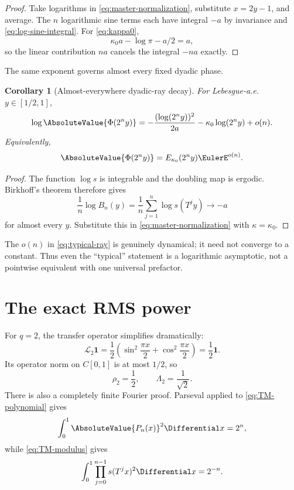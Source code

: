\documentclass[11pt,oneside]{article}
\newtheorem{corollary}[theorem]{Corollary}
\theoremstyle{definition}
\theoremstyle{remark}
\newcommand{\Phiup}{\Phi}
\begin{document}
\begin{proof}
Take logarithms in \eqref{eq:master-normalization}, substitute $x=2y-1$, and average.
The $n$ logarithmic sine terms each have integral $-a$ by invariance and
\eqref{eq:log-sine-integral}.  For \eqref{eq:kappa0},
\[
 \kappa_0a-\log\pi-a/2=a,
\]
so the linear contribution $na$ cancels the integral $-na$ exactly.
\end{proof}

The same exponent governs almost every fixed dyadic phase.

\begin{corollary}[Almost-everywhere dyadic-ray decay]
\label{cor:typical-ray}
For Lebesgue-a.e. $y\in[1/2,1]$,
\begin{equation}
 \log\AbsoluteValue{\Phiup(2^ny)}
 =-\frac{(\log(2^ny))^2}{2a}
  -\kappa_0\log(2^ny)+o(n).
 \label{eq:typical-ray}
\end{equation}
Equivalently,
\[
 \AbsoluteValue{\Phiup(2^ny)}=E_{\kappa_0}(2^ny)\EulerE^{o(n)}.
\]
\end{corollary}

\begin{proof}
The function $\log s$ is integrable and the doubling map is ergodic.  Birkhoff's theorem
therefore gives
\[
 \frac1n\log B_n(y)=\frac1n\sum_{j=1}^{n}\log s(T^jy)\longrightarrow-a
\]
for almost every $y$.  Substitute this in \eqref{eq:master-normalization} with
$\kappa=\kappa_0$.
\end{proof}

The $o(n)$ in \eqref{eq:typical-ray} is genuinely dynamical; it need not converge to a
constant.  Thus even the ``typical'' statement is a logarithmic asymptotic, not a pointwise
equivalent with one universal prefactor.

\section{The exact RMS power}
\label{sec:RMS}

For $q=2$, the transfer operator simplifies dramatically:
\begin{equation}
 \mathcal L_2\mathbf1
 =\frac12\left(\sin^2\frac{\pi x}{2}+\cos^2\frac{\pi x}{2}\right)
 =\frac12\mathbf1.
 \label{eq:L2-one}
\end{equation}
Its operator norm on $C[0,1]$ is at most $1/2$, so
\begin{equation}
 \rho_2=\frac12,
 \qquad
 \Lambda_2=\frac1{\sqrt2}.
 \label{eq:rho2}
\end{equation}
There is also a completely finite Fourier proof.  Parseval applied to
\eqref{eq:TM-polynomial} gives
\[
 \int_0^1\AbsoluteValue{P_n(x)}^2\Differential x=2^n,
\]
while \eqref{eq:TM-modulus} gives
\begin{equation}
 \int_0^1\prod_{j=0}^{n-1}s(T^jx)^2\Differential x=2^{-n}.
 \label{eq:exact-L2-product}
\end{equation}
\end{document}
